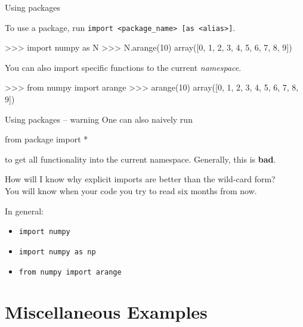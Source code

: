 \documentclass[xetex,10pt]{beamer}
\def\pythoni{\lstinline[language=pythontim]}
\def\spacer{\vspace*{1em}}
\begin{document}
\begin{frame}[fragile]{Using packages}
	
	To use a package, run \pythoni{import}\verb! <package_name> [as <alias>]!.
	\spacer
\begin{python}
>>> import numpy as N
>>> N.arange(10)
array([0, 1, 2, 3, 4, 5, 6, 7, 8, 9])
\end{python}
	\spacer
	\pause
	You can also import specific functions to the current \emph{namespace}.
	\spacer
\begin{python}
>>> from numpy import arange
>>> arange(10)
array([0, 1, 2, 3, 4, 5, 6, 7, 8, 9])
\end{python}

\end{frame}

\begin{frame}[fragile]{Using packages -- warning}
	One can also naively run
	
	\begin{python}
	from package import *
	\end{python}

	to get all functionality into the current namespace. Generally, this is \textbf{bad}.
	\spacer
	\pause
	
	How will I know why explicit imports are better than the wild-card form?\\
	\pause
	You will know when your code you try to read six months from now.\\
	
	\spacer
	\pause

	In general:
	\begin{itemize}
	\item \pythoni{import numpy}
	\item \pythoni{import numpy as np}
	\item \pythoni{from numpy import arange}
	\end{itemize}
	
\end{frame}

\section{Miscellaneous Examples}
\end{document}

